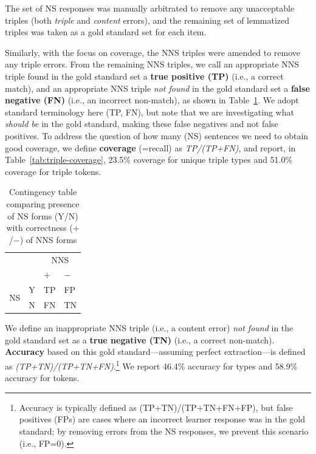 The set of NS responses was manually arbitrated to remove any
unacceptable triples (both \textit{triple} and \textit{content}
errors), and the remaining set of lemmatized triples was taken as a gold standard
set for each item.

Similarly, with the focus on coverage, the NNS triples were amended to
remove any triple errors.
From the remaining NNS triples, we call an appropriate NNS triple
found in the gold standard set a \textbf{true positive (TP)} (i.e., a
correct match), and an appropriate NNS triple \textit{not found} in
the gold standard set a \textbf{false negative (FN)} (i.e., an
incorrect non-match), as shown in Table~\ref{tab:contingencies}.  We
adopt standard terminology here (TP, FN), but note that we are
investigating what \emph{should be} in the gold standard, making these
false negatives and not false positives.  To address the question of
how many (NS) sentences we need to obtain good coverage, we define
\textbf{coverage} (=recall) as \textit{TP/(TP+FN)}, and report, in
Table~\ref{tab:triple-coverage}, 23.5\% coverage for unique triple
types and 51.0\% coverage for triple tokens.

\begin{table}[htb!]
\begin{center}
\begin{tabular}{|ll||l|l|}
  \hline
  & & \multicolumn{2}{c|}{NNS}\\
  & & $+$ & $-$ \\
  \hline
  \hline
  \multirow{2}{*}{NS} & Y & TP & FP \\
  \cline{2-4}
  & N & FN & TN\\
  \hline
\end{tabular}
\end{center}
\caption{Contingency table comparing presence of NS forms (Y/N) with
  correctness ($+$/$-$) of NNS forms}
\label{tab:contingencies}
\end{table}

We define an inappropriate NNS triple (i.e., a content error)
\textit{not found} in the gold standard set as a \textbf{true negative
  (TN)} (i.e., a correct non-match). \textbf{Accuracy} based on this
gold standard---assuming perfect extraction---is defined as
\textit{(TP+TN)/(TP+TN+FN)}.\footnote{Accuracy is typically defined as
  (TP+TN)/(TP+TN+FN+FP), but false positives (FPs) are cases where an
  incorrect learner response was in the gold standard; by removing errors from the NS responses, we prevent this scenario (i.e., FP=0).} We report 46.4\% accuracy for types and 58.9\% accuracy for tokens.

